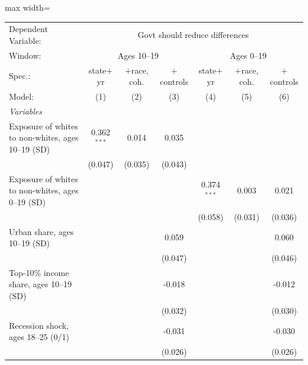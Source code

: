       \begin{adjustbox}{max width=\linewidth}
   \begin{tabular}{lcccccc}
      \tabularnewline \midrule \midrule
      Dependent Variable: & \multicolumn{6}{c}{Govt should reduce differences}\\
      Window: & \multicolumn{3}{c}{Ages 10--19} & \multicolumn{3}{c}{Ages 0--19} \\ 
      Spec.:                                             & state$+$yr    & $+$race, coh. & $+$controls & state$+$yr    & $+$race, coh. & $+$controls \\   
      Model:                                             & (1)           & (2)           & (3)         & (4)           & (5)           & (6)\\  
      \midrule
      \emph{Variables}\\
      Exposure of whites to non-whites, ages 10--19 (SD) & 0.362$^{***}$ & 0.014         & 0.035       &               &               &   \\   
                                                         & (0.047)       & (0.035)       & (0.043)     &               &               &   \\   
      Exposure of whites to non-whites, ages 0--19 (SD)  &               &               &             & 0.374$^{***}$ & 0.003         & 0.021\\   
                                                         &               &               &             & (0.058)       & (0.031)       & (0.036)\\   
      Urban share, ages 10--19 (SD)                      &               &               & 0.059       &               &               & 0.060\\   
                                                         &               &               & (0.047)     &               &               & (0.046)\\   
      Top-10\% income share, ages 10--19 (SD)            &               &               & -0.018      &               &               & -0.012\\   
                                                         &               &               & (0.032)     &               &               & (0.030)\\   
      Recession shock, ages 18--25 (0/1)                 &               &               & -0.031      &               &               & -0.030\\   
                                                         &               &               & (0.026)     &               &               & (0.026)\\   

\end{tabular}
\end{adjustbox}
